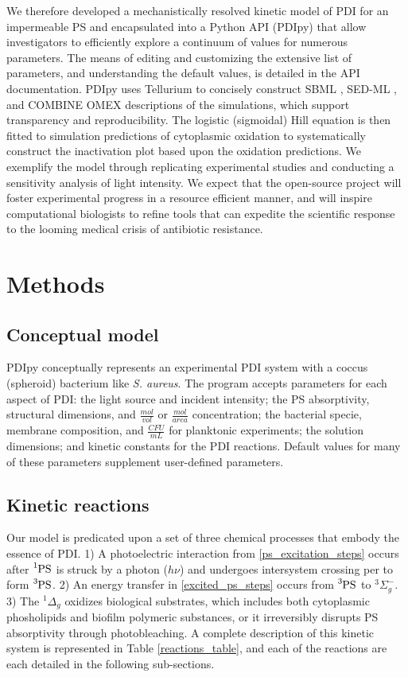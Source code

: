 We therefore developed a mechanistically resolved kinetic model of PDI for an impermeable PS and encapsulated into a Python API (PDIpy) that allow investigators to efficiently explore a continuum of values for numerous parameters. The means of editing and customizing the extensive list of parameters, and understanding the default values, is detailed in the API documentation. PDIpy uses Tellurium \cite{Choi2018Tellurium:Biology} to concisely construct SBML \cite{Keating2020Models}, SED-ML \cite{Waltemath2011ReproducibleLanguage}, and COMBINE OMEX \cite{Bergmann2014COMBINEProject} descriptions of the simulations, which support transparency and reproducibility. The logistic (sigmoidal) Hill equation is then fitted to simulation predictions of cytoplasmic oxidation to systematically construct the inactivation plot based upon the oxidation predictions. We exemplify the model through replicating experimental studies and conducting a sensitivity analysis of light intensity. We expect that the open-source project will foster experimental progress in a resource efficient manner, and will inspire computational biologists to refine tools that can expedite the scientific response to the looming medical crisis of antibiotic resistance. 

\section{Methods} \label{methods}
\subsection{Conceptual model}
PDIpy conceptually represents an experimental PDI system with a coccus (spheroid) bacterium like \textit{S. aureus}. The program accepts parameters for each aspect of PDI: the light source and incident intensity; the PS absorptivity, structural dimensions, and $\frac{mol}{vol}$ or $\frac{mol}{area}$ concentration; the bacterial specie, membrane composition, and $\frac{CFU}{mL}$ for planktonic experiments; the solution dimensions; and kinetic constants for the PDI reactions. Default values for many of these parameters supplement user-defined parameters.

\subsection{Kinetic reactions}
Our model is predicated upon a set of three chemical processes that embody the essence of PDI. 1) A photoelectric interaction \cite{Wheaton2009PhotoelectricEffect} from \cref{ps_excitation_steps} occurs after $\ce{^1PS}$ is struck by a photon ($h\nu$) and undergoes intersystem crossing per to form $\ce{^3PS}$. 2) An energy transfer in \cref{excited_ps_steps} occurs from $\ce{^3PS}$ to $^3\Sigma_g^-$. 3) The $^1\Delta_g$ oxidizes biological substrates, which includes both cytoplasmic phosholipids and biofilm polymeric substances, or it irreversibly disrupts PS absorptivity through photobleaching. A complete description of this kinetic system is represented in Table \ref{reactions_table}, and each of the reactions are each detailed in the following sub-sections.

